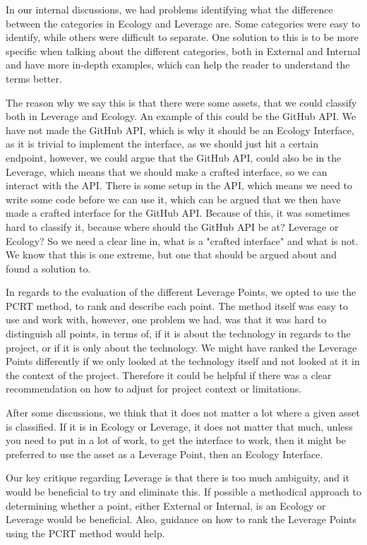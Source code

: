 In our internal discussions, we had problems identifying what the difference between the categories in Ecology and Leverage are.
Some categories were easy to identify, while others were difficult to separate.
One solution to this is to be more specific when talking about the different categories, both in External and Internal and have more in-depth examples, which can help the reader to understand the terms better.

The reason why we say this is that there were some assets, that we could classify both in Leverage and Ecology.
An example of this could be the GitHub API.
We have not made the GitHub API, which is why it should be an Ecology Interface, as it is trivial to implement the interface, as we should just hit a certain endpoint, however, we could argue that the GitHub API, could also be in the Leverage, which means that we should make a crafted interface, so we can interact with the API.
There is some setup in the API, which means we need to write some code before we can use it, which can be argued that we then have made a crafted interface for the GitHub API.
Because of this, it was sometimes hard to classify it, because where should the GitHub API be at? 
Leverage or Ecology?
So we need a clear line in, what is a "crafted interface" and what is not.
We know that this is one extreme, but one that should be argued about and found a solution to.  

In regards to the evaluation of the different Leverage Points, we opted to use the PCRT method, to rank and describe each point.
The method itself was easy to use and work with, however, one problem we had, was that it was hard to distinguish all points, in terms of, if it is about the technology in regards to the project, or if it is only about the technology.
We might have ranked the Leverage Points differently if we only looked at the technology itself and not looked at it in the context of the project.
Therefore it could be helpful if there was a clear recommendation on how to adjust for project context or limitations.

After some discussions, we think that it does not matter a lot where a given asset is classified.
If it is in Ecology or Leverage, it does not matter that much, unless you need to put in a lot of work, to get the interface to work, then it might be preferred to use the asset as a Leverage Point, then an Ecology Interface.

Our key critique regarding Leverage is that there is too much ambiguity, and it would be beneficial to try and eliminate this. 
If possible a methodical approach to determining whether a point, either External or Internal, is an Ecology or Leverage would be beneficial.
Also, guidance on how to rank the Leverage Points using the PCRT method would help.


